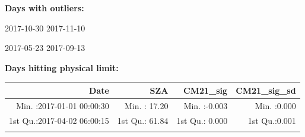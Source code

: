\documentclass[
  10pt,
  a4paper,oneside]{article}
\begin{document}
\normalsize

\textbf{Days with outliers:}

2017-10-30 2017-11-10

2017-05-23 2017-09-13

\textbf{Days hitting physical limit:}

\footnotesize

\begin{longtable}[]{@{}rrrr@{}}
\toprule
\begin{minipage}[b]{0.33\columnwidth}\raggedleft
Date\strut
\end{minipage} & \begin{minipage}[b]{0.19\columnwidth}\raggedleft
SZA\strut
\end{minipage} & \begin{minipage}[b]{0.19\columnwidth}\raggedleft
CM21\_sig\strut
\end{minipage} & \begin{minipage}[b]{0.19\columnwidth}\raggedleft
CM21\_sig\_sd\strut
\end{minipage}\tabularnewline
\midrule
\endhead
\begin{minipage}[t]{0.33\columnwidth}\raggedleft
Min. :2017-01-01 00:00:30\strut
\end{minipage} & \begin{minipage}[t]{0.19\columnwidth}\raggedleft
Min. : 17.20\strut
\end{minipage} & \begin{minipage}[t]{0.19\columnwidth}\raggedleft
Min. :-0.003\strut
\end{minipage} & \begin{minipage}[t]{0.19\columnwidth}\raggedleft
Min. :0.000\strut
\end{minipage}\tabularnewline
\begin{minipage}[t]{0.33\columnwidth}\raggedleft
1st Qu.:2017-04-02 06:00:15\strut
\end{minipage} & \begin{minipage}[t]{0.19\columnwidth}\raggedleft
1st Qu.: 61.84\strut
\end{minipage} & \begin{minipage}[t]{0.19\columnwidth}\raggedleft
1st Qu.: 0.000\strut
\end{minipage} & \begin{minipage}[t]{0.19\columnwidth}\raggedleft
1st Qu.:0.001\strut
\end{minipage}\tabularnewline
\begin{minipage}[t]{0.33\columnwidth}\raggedleft

\end{minipage}
\end{longtable}
\end{document}
